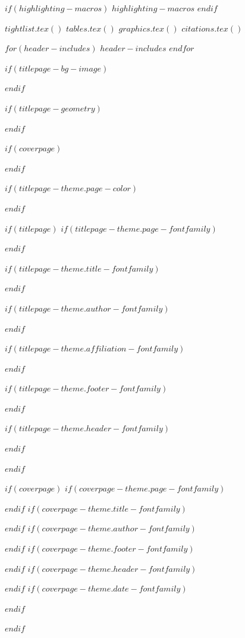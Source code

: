 $if(highlighting-macros)$
$highlighting-macros$
$endif$

$tightlist.tex()$
$tables.tex()$
$graphics.tex()$
$citations.tex()$

$for(header-includes)$
$header-includes$
$endfor$

\usepackage{hyphenat}
\usepackage{ifthen}
\usepackage{calc}
\usepackage{calculator}
\usepackage{orcidlink}

$if(titlepage-bg-image)$
\usepackage{graphicx}
\usepackage{wallpaper}
$endif$

$if(titlepage-geometry)$
\usepackage{geometry}
$endif$

$if(coverpage)$
\usepackage{graphicx}
\usepackage{geometry}
\usepackage{afterpage}
\usepackage{tikz}
\usetikzlibrary{calc}
\usetikzlibrary{fadings}
\usepackage[pagecolor=none]{pagecolor}
$endif$

$if(titlepage-theme.page-color)$
\usepackage[pagecolor=none]{pagecolor}
$endif$

$if(titlepage)$
$if(titlepage-theme.page-fontfamily)$
\usepackage{fontspec}
$endif$

$if(titlepage-theme.title-fontfamily)$
\usepackage{fontspec}
$endif$

$if(titlepage-theme.author-fontfamily)$
\usepackage{fontspec}
$endif$

$if(titlepage-theme.affiliation-fontfamily)$
\usepackage{fontspec}
$endif$

$if(titlepage-theme.footer-fontfamily)$
\usepackage{fontspec}
$endif$

$if(titlepage-theme.header-fontfamily)$
\usepackage{fontspec}
$endif$

$endif$

$if(coverpage)$
$if(coverpage-theme.page-fontfamily)$
\usepackage{fontspec}
$endif$
$if(coverpage-theme.title-fontfamily)$
\usepackage{fontspec}
$endif$
$if(coverpage-theme.author-fontfamily)$
\usepackage{fontspec}
$endif$
$if(coverpage-theme.footer-fontfamily)$
\usepackage{fontspec}
$endif$
$if(coverpage-theme.header-fontfamily)$
\usepackage{fontspec}
$endif$
$if(coverpage-theme.date-fontfamily)$
\usepackage{fontspec}
$endif$

$endif$

